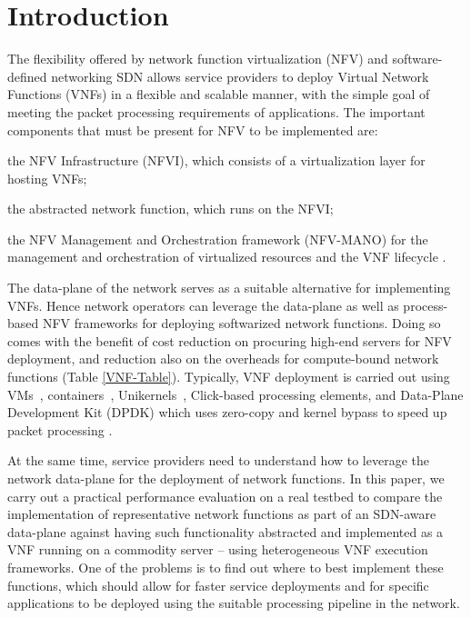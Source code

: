 \documentclass[conference]{IEEEtran}
\begin{document}
\section{Introduction}
\label{Introduction}
The flexibility offered by network function virtualization (NFV) and software-defined networking SDN allows service providers to deploy Virtual Network Functions (VNFs) in a flexible and scalable manner, with the simple goal of meeting the packet processing requirements of applications. The important components that must be present for NFV to be implemented are: 
\begin{enumerate*}[label=(\roman*)]
    \item the NFV Infrastructure (NFVI), which consists of a virtualization layer for hosting VNFs;
    \item the abstracted network function, which runs on the NFVI; 
    \item the NFV Management and Orchestration framework (NFV-MANO) for the management and orchestration of virtualized resources and the VNF lifecycle \cite{asquini2021etsi}.
\end{enumerate*}

The data-plane of the network serves as a suitable alternative for implementing VNFs. Hence network operators can leverage the data-plane as well as process-based NFV frameworks for deploying softwarized network functions.
Doing so comes with the benefit of cost reduction on procuring high-end servers for NFV deployment, and reduction also on the overheads for compute-bound network functions (Table \ref{VNF-Table}). 
Typically, VNF deployment is carried out using 
VMs~\cite{qureshi2022network}, 
containers~\cite{huang2021novel}, 
Unikernels~\cite{wang2022performance}, 
Click-based processing elements, 
and Data-Plane Development Kit (DPDK) which uses zero-copy and kernel bypass to speed up packet processing \cite{zhang2016opennetvm}. 

At the same time, service providers need to understand how to leverage the network data-plane for the deployment of network functions. In this paper, we carry out a practical performance evaluation on a real testbed to compare the implementation of representative network functions as part of an SDN-aware data-plane against having such functionality abstracted and implemented as a VNF running on a commodity server -- using heterogeneous VNF execution frameworks. One of the problems is to find out where to best implement these functions, which should allow for faster service deployments and for specific applications to be deployed using the suitable processing pipeline in the network.
\end{document}
